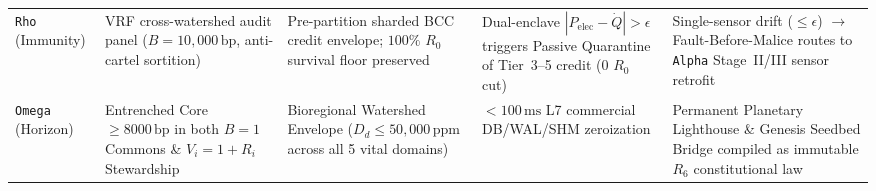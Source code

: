 \begin{table}[htbp]
{\begin{tabular}{@{}lllll@{}}
\texttt{Rho} (Immunity) & VRF cross-watershed audit panel ($B=10{,}000\,\mathrm{bp}$, anti-cartel sortition) & Pre-partition sharded BCC credit envelope; $100\%$ $R_0$ survival floor preserved & Dual-enclave $|P_{\mathrm{elec}}-\dot{Q}|>\epsilon$ triggers Passive Quarantine of Tier~3--5 credit ($0$ $R_0$ cut) & Single-sensor drift ($\le \epsilon$) $\to$ Fault-Before-Malice routes to \texttt{Alpha} Stage~II/III sensor retrofit \\
\texttt{Omega} (Horizon) & Entrenched Core $\ge 8000\,\mathrm{bp}$ in both $B=1$ Commons \& $V_i=1+R_i$ Stewardship & Bioregional Watershed Envelope ($D_d \le 50{,}000\,\mathrm{ppm}$ across all 5 vital domains) & $<100\,\mathrm{ms}$ L7 commercial DB/WAL/SHM zeroization & Permanent Planetary Lighthouse \& Genesis Seedbed Bridge compiled as immutable $R_6$ constitutional law \\
\bottomrule
\end{tabular}%
}
\end{table}
